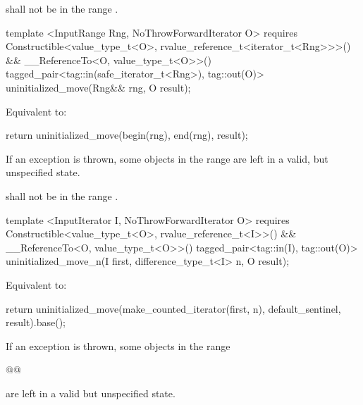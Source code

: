 {\color{addclr}
\pnum
\requires {} shall not be in the range \tcode{[first, last)}.

\begin{codeblock}
template <InputRange Rng, NoThrowForwardIterator O>
  requires Constructible<value_type_t<O>, rvalue_reference_t<iterator_t<Rng>>>() &&
           __ReferenceTo<O, value_type_t<O>>()
    tagged_pair<tag::in(safe_iterator_t<Rng>), tag::out(O)>
    uninitialized_move(Rng&& rng, O result);
\end{codeblock}

\pnum
\effects Equivalent to:
\begin{codeblock}
        return uninitialized_move(begin(rng), end(rng), result);
\end{codeblock}

\pnum
\remarks If an exception is thrown, some objects in the range\tcode{[begin(rng), end(rng))} are left in a valid, but
unspecified state.

\pnum
\requires {} shall not be in the range \tcode{[begin(rng), end(rng))}.

\begin{codeblock}
template <InputIterator I, NoThrowForwardIterator O>
  requires Constructible<value_type_t<O>, rvalue_reference_t<I>>() &&
           __ReferenceTo<O, value_type_t<O>>()
    tagged_pair<tag::in(I), tag::out(O)>
    uninitialized_move_n(I first, difference_type_t<I> n, O result);
\end{codeblock}

\pnum
\effects Equivalent to:
\begin{codeblock}
        return uninitialized_move(make_counted_iterator(first, n),
                                  default_sentinel{}, result).base();
\end{codeblock}

\pnum
} %
\remarks If an exception is thrown, some objects in the range
\begin{codeblock}
        @\changed{[first, std::next(first, n))}{[make_counted_iterator(first, n), default_sentinel{})}@
\end{codeblock}
are left in a valid\added{,} but unspecified state.

\pnum
{}


